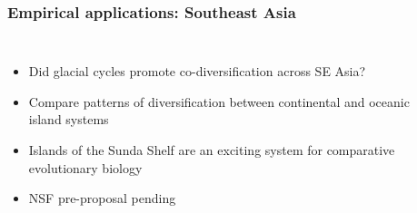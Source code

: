 \begin{frame}
    \frametitle{Empirical applications: Southeast Asia}
    \begin{columns}
        \begin{itemize}[<+->]
            \item Did glacial cycles promote co-diversification across SE Asia?
            \item Compare patterns of diversification between continental and
                oceanic island systems
            \item Islands of the Sunda Shelf are an exciting system for
                comparative evolutionary biology
            \item NSF pre-proposal pending
        \end{itemize}
        
        {\centering
            {\setlength{\fboxsep}{0pt}
            }
        }
    \end{columns}
\end{frame}

